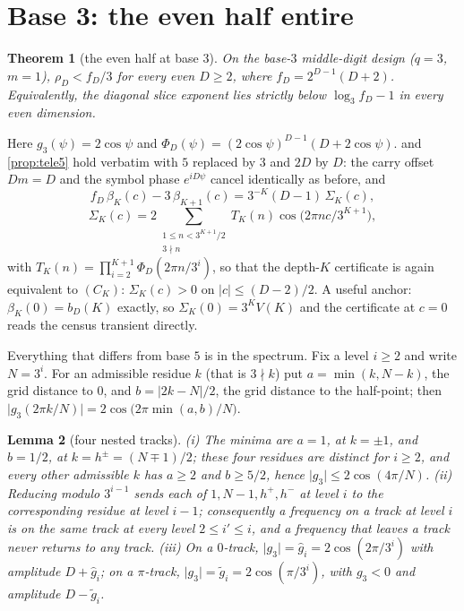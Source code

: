 \documentclass[11pt]{amsart}
\newtheorem{theorem}{Theorem}[section]
\newtheorem{lemma}[theorem]{Lemma}
\theoremstyle{definition}
\theoremstyle{remark}
\begin{document}

\section{Base 3: the even half entire}
\label{sec:base3}

\begin{theorem}[the even half at base $3$]
\label{thm:base3}
On the base-$3$ middle-digit design ($q = 3$, $m = 1$), $\rho_D < f_D/3$ for every even $D \ge 2$, where $f_D = 2^{D-1}(D+2)$. Equivalently, the diagonal slice exponent lies strictly below $\log_3 f_D - 1$ in every even dimension.
\end{theorem}

Here $g_3(\psi) = 2\cos\psi$ and $\Phi_D(\psi) = (2\cos\psi)^{D-1}(D + 2\cos\psi)$.  and \cref{prop:tele5} hold verbatim with $5$ replaced by $3$ and $2D$ by $D$: the carry offset $Dm = D$ and the symbol phase $e^{iD\psi}$ cancel identically as before, and
\[
  f_D\,\beta_K(c) - 3\,\beta_{K+1}(c) = 3^{-K}(D-1)\,\Sigma_K(c),
\]
\[
  \Sigma_K(c) = 2\!\!\sum_{\substack{1 \le n < 3^{K+1}/2\\ 3\nmid n}}\!\! T_K(n)\cos\!\bigl(2\pi nc/3^{K+1}\bigr),
\]
with $T_K(n) = \prod_{i=2}^{K+1}\Phi_D(2\pi n/3^i)$, so that the depth-$K$ certificate is again equivalent to $(C_K)$: $\Sigma_K(c) > 0$ on $\lvert c \rvert \le (D-2)/2$. A useful anchor: $\beta_K(0) = b_D(K)$ exactly, so $\Sigma_K(0) = 3^K V(K)$ and the certificate at $c = 0$ reads the census transient directly.

Everything that differs from base $5$ is in the spectrum. Fix a level $i \ge 2$ and write $N = 3^i$. For an admissible residue $k$ (that is $3 \nmid k$) put $a = \min(k, N-k)$, the grid distance to $0$, and $b = \lvert 2k - N\rvert/2$, the grid distance to the half-point; then $\lvert g_3(2\pi k/N)\rvert = 2\cos\bigl(2\pi\min(a,b)/N\bigr)$.

\begin{lemma}[four nested tracks]
\label{lem:tracks3}
(i) The minima are $a = 1$, at $k = \pm 1$, and $b = 1/2$, at $k = h^{\pm} = (N \mp 1)/2$; these four residues are distinct for $i \ge 2$, and every other admissible $k$ has $a \ge 2$ and $b \ge 5/2$, hence $\lvert g_3\rvert \le 2\cos(4\pi/N)$. (ii) Reducing modulo $3^{i-1}$ sends each of $1, N-1, h^{+}, h^{-}$ at level $i$ to the corresponding residue at level $i-1$; consequently a frequency on a track at level $i$ is on the same track at every level $2 \le i' \le i$, and a frequency that leaves a track never returns to any track. (iii) On a $0$-track, $\lvert g_3\rvert = \hat g_i = 2\cos(2\pi/3^i)$ with amplitude $D + \hat g_i$; on a $\pi$-track, $\lvert g_3 \rvert = \tilde g_i = 2\cos(\pi/3^i)$, with $g_3 < 0$ and amplitude $D - \tilde g_i$.
\end{lemma}
\end{document}
